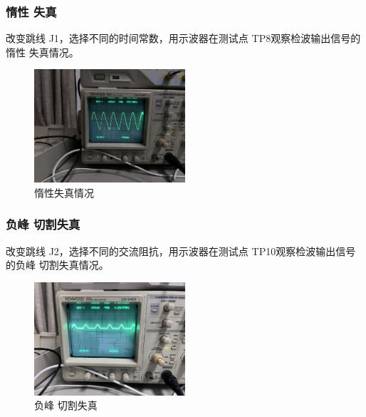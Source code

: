 \documentclass{../source/Experiment}
\begin{document}
\subsubsection{惰性
    失真}
改变跳线 J1，选择不同的时间常数，用示波器在测试点 TP8观察检波输出信号的惰性
失真情况。
\begin{figure}[H]
    \centering
    \includegraphics[width = 0.5\textwidth]{lab6/6.jpg}
    \caption{惰性失真情况}
\end{figure}

\subsubsection{负峰
    切割失真}
改变跳线 J2，选择不同的交流阻抗，用示波器在测试点 TP10观察检波输出信号的负峰
切割失真情况。
\begin{figure}[H]
    \centering
    \includegraphics[width = 0.5\textwidth]{lab6/7.jpg}
    \caption{负峰
        切割失真}
\end{figure}
\end{document}
